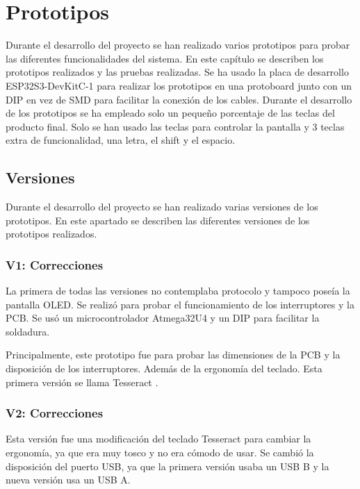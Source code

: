 \chapter{Prototipos}

Durante el desarrollo del proyecto se han realizado varios prototipos para probar las diferentes funcionalidades del sistema. En este capítulo se describen los prototipos realizados y las pruebas realizadas. Se ha usado la placa de desarrollo ESP32S3-DevKitC-1 para realizar los prototipos en una protoboard junto con un  DIP en vez de \gls{SMD} para facilitar la conexión de los cables. Durante el desarrollo de los prototipos se ha empleado solo un pequeño porcentaje de las teclas del producto final. Solo se han usado las teclas para controlar la pantalla y 3 teclas extra de funcionalidad, una letra, el shift y el espacio.


\section{Versiones}
Durante el desarrollo del proyecto se han realizado varias versiones de los prototipos. En este apartado se describen las diferentes versiones de los prototipos realizados.

\subsection{V1: Correcciones}
La primera de todas las versiones no contemplaba protocolo  y tampoco poseía la pantalla \gls{OLED}. Se realizó para probar el funcionamiento de los interruptores y la \gls{PCB}. Se usó un microcontrolador Atmega32U4 y un  DIP para facilitar la soldadura.

Principalmente, este prototipo fue para probar las dimensiones de la \gls{PCB} y la disposición de los interruptores. Además de la ergonomía del teclado. Esta primera versión se llama Tesseract \cite{Tesseract}.

\subsection{V2: Correcciones}
Esta versión fue una modificación del teclado Tesseract \cite{Tesseract} para cambiar la ergonomía, ya que era muy tosco y no era cómodo de usar. Se cambió la disposición del puerto \gls{USB}, ya que la primera versión usaba un \gls{USB} B y la nueva versión usa un \gls{USB} A.

